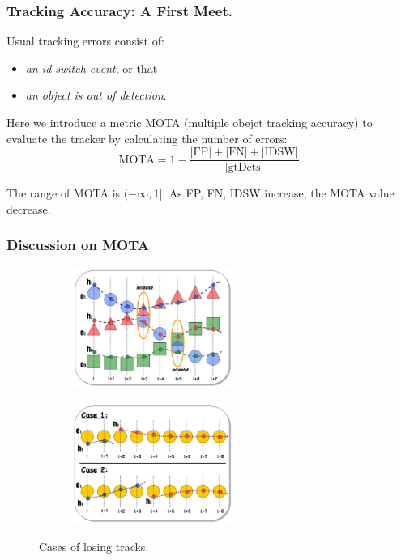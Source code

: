 \documentclass[slidetop, mathserif]{beamer}
\begin{document}
\begin{frame}
	\frametitle{Tracking Accuracy: A First Meet.}

	Usual tracking errors consist of:
	\begin{itemize}
	\item \emph{an id switch event}, or that
	\item \emph{an object is out of detection}.
	\end{itemize}

	Here we introduce a metric MOTA (multiple obejct tracking accuracy)
	to evaluate the tracker by calculating the number of errors:
	\[
		\text{MOTA} = 1 - \dfrac{|\text{FP}| + |\text{FN}| + |\text{IDSW}|}{|\text{gtDets}|}.
	\]

	The range of MOTA is $(-\infty,1]$. As FP, FN, IDSW increase, the MOTA value decrease.

\end{frame}

\begin{frame}
	\frametitle{Discussion on MOTA}

	\begin{figure}
		\begin{subfigure}{.49\textwidth}
			\includegraphics[width=150pt]{pics/fig16.png}
		\end{subfigure}
		\begin{subfigure}{.49\textwidth}
			\includegraphics[width=150pt]{pics/fig17.png}
		\end{subfigure}
		\caption{Cases of losing tracks.}
	\end{figure}
\end{frame}
\end{document}
